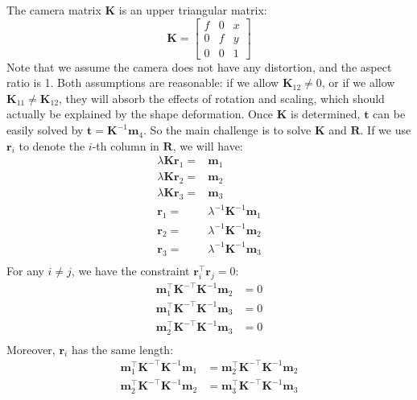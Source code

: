 \documentclass[10pt,twocolumn,letterpaper]{article}
\begin{document}
\noindent
The camera matrix $\mathbf{K}$ is an upper triangular matrix:
\begin{equation}
\mathbf{K}=\left [
\begin{array}{ccc}
f & 0 & x \\
0 & f & y \\
0 & 0 & 1
\end{array}
\right ]
\end{equation}
Note that we assume the camera does not have any distortion, and the aspect ratio is 1. Both assumptions are reasonable: if we allow $\mathbf{K}_{12}\neq 0$, or if we allow $\mathbf{K}_{11}\neq\mathbf{K}_{12}$, they will absorb the effects of rotation and scaling, which should actually be explained by the shape deformation. Once $\mathbf{K}$ is determined, $\mathbf{t}$ can be easily solved by $\mathbf{t} = \mathbf{K}^{-1}\mathbf{m}_4$. So the main challenge is to solve $\mathbf{K}$ and $\mathbf{R}$. If we use $\mathbf{r}_i$ to denote the $i$-th column in $\mathbf{R}$, we will have:
\begin{equation}
\begin{split}
\lambda\mathbf{K}\mathbf{r}_1=&\mathbf{m}_1\\
\lambda\mathbf{K}\mathbf{r}_2=&\mathbf{m}_2\\
\lambda\mathbf{K}\mathbf{r}_3=&\mathbf{m}_3\\
\mathbf{r}_1=&\lambda^{-1}\mathbf{K}^{-1}\mathbf{m}_1\\
\mathbf{r}_2=&\lambda^{-1}\mathbf{K}^{-1}\mathbf{m}_2\\
\mathbf{r}_3=&\lambda^{-1}\mathbf{K}^{-1}\mathbf{m}_3\\
\end{split}
\end{equation}
For any $i\neq j$, we have the constraint $\mathbf{r}_i^\top\mathbf{r}_j=0$:
\begin{equation}
\begin{split}
\mathbf{m}_1^\top\mathbf{K}^{-\top}\mathbf{K}^{-1}\mathbf{m}_2&=0\\
\mathbf{m}_1^\top\mathbf{K}^{-\top}\mathbf{K}^{-1}\mathbf{m}_3&=0\\
\mathbf{m}_2^\top\mathbf{K}^{-\top}\mathbf{K}^{-1}\mathbf{m}_3&=0\\
\end{split}
\end{equation}
Moreover, $\mathbf{r}_i$ has the same length:
\begin{equation}
\begin{split}
\mathbf{m}_1^\top\mathbf{K}^{-\top}\mathbf{K}^{-1}\mathbf{m}_1&=\mathbf{m}_2^\top\mathbf{K}^{-\top}\mathbf{K}^{-1}\mathbf{m}_2\\
\mathbf{m}_2^\top\mathbf{K}^{-\top}\mathbf{K}^{-1}\mathbf{m}_2&=\mathbf{m}_3^\top\mathbf{K}^{-\top}\mathbf{K}^{-1}\mathbf{m}_3\\
\end{split}
\end{equation}
\end{document}
